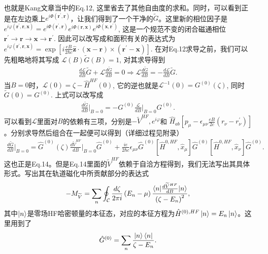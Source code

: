 \documentclass[10pt, oneside]{article}
\newcommand{\vph}{\varphi}
\newcommand{\pr}{\prime}
\newcommand{\p}[1]{\left(#1\right)}
\newcommand{\bb}[1]{\left[#1\right]}
\begin{document}
也就是Kang文章当中的Eq.12, 这里省去了其他自由度的求和。同时，可以看到正是在左边乘上\(e^{i \Phi \p{\bm{r}^\pr, \bm{r}}}\)，让我们得到了一个干净的\(\widetilde{G}\)。这里新的相位因子是 \(e^{i \vph \p{\bm{r}^\pr, \bm{r},\bm{x}}} = e^{i \Phi \p{\bm{r}^\pr,\bm{r}}}  e^{i \Phi \p{\bm{r},\bm{x}}} e^{i \Phi \p{\bm{x},\bm{r}^\pr}}\), 这是一个规范不变的闭合磁通相位\(\bm{r}^\pr \rightarrow \bm{r} \rightarrow \bm{x} \rightarrow \bm{r}^\pr\). 因此可以改写成和面积有关的表达式为\(e^{i \vph \p{\bm{r}^\pr, \bm{r},\bm{x}}} = \exp \bb{i \frac{eB}{2 \hbar c}  \hat{\bm{z}} \cdot \p{\bm{x} - \bm{r}} \times \p{\bm{r}^\pr - \bm{x}}}  \). 在对Eq.12求导之前，我们可以先粗略地将其写成 \(\mathcal{L} \p{B} \widetilde{G} \p{B} = 1\), 对其求导得到
\begin{align}
	\frac{d\mathcal{L}}{dB} \widetilde{G} + \mathcal{L} \frac{d \widetilde{G}}{d B} = 0 \Rightarrow \mathcal{L} \frac{d \widetilde{G}}{d B} = - \frac{d \mathcal{L}}{d B} \widetilde{G}.
\end{align}
当\(B = 0\)时，\(\mathcal{L}\p{0} = \zeta - \hat{H}^{HF}\p{0}\), 它的逆也就是\(\mathcal{L}^{-1} \p{0} = G^{\p{0}} \p{\zeta}\), 同时 \(\widetilde{G} \p{0} = G^{\p{0}}\). 上式可以改写成
\begin{align}
	\frac{d \widetilde{G}}{d B} \Bigg|_{B = 0} = - G^{\p{0}} \frac{\mathcal{L}}{d B} \Bigg|_{B=0} G^{\p{0}}.
\end{align}
可以看到\(\mathcal{L}\)里面对\(B\)的依赖有三项，分别是\(- \widetilde{V}^{HF}, e^{i \vph}\)和 \(\hat{H}_{ab} \bb{p_\mu - \epsilon_{\mu \nu} \frac{eB}{2 c} \p{r_{\nu} - r_{\nu}^\pr}} \)。分别求导然后组合在一起便可以得到（详细过程见附录）
\begin{align}
	\frac{d \widetilde{G}}{d B} \Bigg|_{B = 0}  = \hat{G}^{\p{0}} \p{\zeta} \frac{d \widetilde{V}^{HF}}{d B}\Bigg|_{B = 0}  \hat{G}^{\p{0}}  + \frac{i e}{2 \hbar c} \epsilon_{\mu \nu} \hat{G}^{\p{0}} \bb{\hat{H}^{0, HF} , \hat{x}_{\mu}} \hat{G}^{\p{0}}  \bb{\hat{H}^{0, HF} , \hat{x}_{\nu}} \hat{G}^{\p{0}}.
\end{align}
这也正是Eq.14。但是Eq.14里面的\(\widetilde{V}^{HF}\)依赖于自洽方程得到，我们无法写出其具体形式。写出其在轨道磁化中所贡献部分的表达式
\begin{align}
	- M_{\widetilde{V}} = \sum_{n} \oint_{\mathcal{C}} \frac{d \zeta}{2 \pi i} \p{E_n - \mu} \frac{\braket{n | \frac{d \widetilde{V}^{HF}}{d B} | n}}{\p{\zeta - E_n}^2},
\end{align}
其中\(\ket{n}\)是零场HF哈密顿量的本征态，对应的本征方程为\(\hat{H}^{\p{0},  HF} \ket{n} = E_n \ket{n}\)。这里用到了
\begin{align}
	\hat{G}^{\p{0}} = \sum_n \frac{\ket{n}\bra{n}}{\zeta - E_n}.
\end{align}
\end{document}
